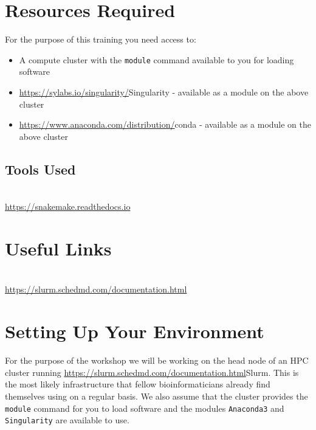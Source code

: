 \section{Resources Required}

For the purpose of this training you need access to:

\begin{itemize}
  \item A compute cluster with the \texttt{module} command available to you for loading software
  \item \url{https://sylabs.io/singularity/}{Singularity} - available as a module on the above cluster
  \item \url{https://www.anaconda.com/distribution/}{conda} - available as a module on the above cluster
\end{itemize}


\subsection{Tools Used}
\begin{description}[style=multiline,labelindent=0cm,align=left,leftmargin=0.5cm]
  \item[Snakemake]\hfill\\
  	\url{https://snakemake.readthedocs.io}
\end{description}

\section{Useful Links}
 
\begin{description}[style=multiline,labelindent=0cm,align=left,leftmargin=0.5cm]
  \item[Slurm Documentation]\hfill\\
    \url{https://slurm.schedmd.com/documentation.html}
\end{description}

\newpage

\section{Setting Up Your Environment}

For the purpose of the workshop we will be working on the head node of an HPC cluster running \url{https://slurm.schedmd.com/documentation.html}{Slurm}.
This is the most likely infrastructure that fellow bioinformaticians already find themselves using
on a regular basis. We also assume that the cluster provides the \texttt{module} command for you to
load software and the modules \texttt{Anaconda3} and \texttt{Singularity} are available to use.

